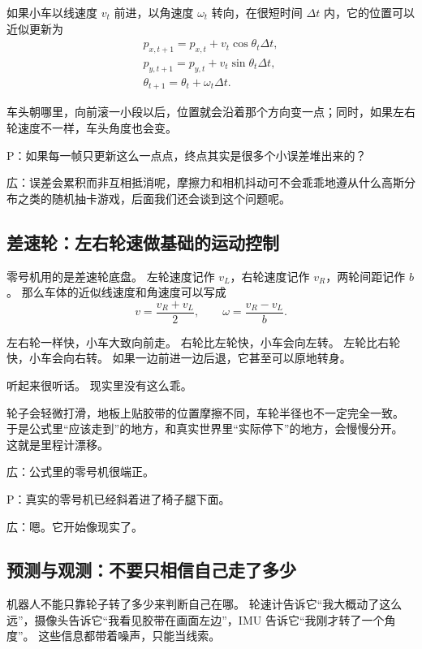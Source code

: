 如果小车以线速度 $v_t$ 前进，以角速度 $\omega_t$ 转向，在很短时间 $\Delta t$ 内，它的位置可以近似更新为
\begin{equation}
\begin{array}{l}
p_{x,t+1} = p_{x,t} + v_t \cos \theta_t \Delta t,\\
p_{y,t+1} = p_{y,t} + v_t \sin \theta_t \Delta t,\\
\theta_{t+1} = \theta_t + \omega_t \Delta t.
\end{array}
\end{equation}

车头朝哪里，向前滚一小段以后，位置就会沿着那个方向变一点；同时，如果左右轮速度不一样，车头角度也会变。

P：如果每一帧只更新这么一点点，终点其实是很多个小误差堆出来的？

広：误差会累积而非互相抵消呢，摩擦力和相机抖动可不会乖乖地遵从什么高斯分布之类的随机抽卡游戏，后面我们还会谈到这个问题呢。

\subsection{差速轮：左右轮速做基础的运动控制}

零号机用的是差速轮底盘。
左轮速度记作 $v_L$，右轮速度记作 $v_R$，两轮间距记作 $b$。
那么车体的近似线速度和角速度可以写成
\begin{equation}
v = \frac{v_R+v_L}{2}, \qquad
\omega = \frac{v_R-v_L}{b}.
\end{equation}

左右轮一样快，小车大致向前走。
右轮比左轮快，小车会向左转。
左轮比右轮快，小车会向右转。
如果一边前进一边后退，它甚至可以原地转身。

听起来很听话。
现实里没有这么乖。

轮子会轻微打滑，地板上贴胶带的位置摩擦不同，车轮半径也不一定完全一致。
于是公式里“应该走到”的地方，和真实世界里“实际停下”的地方，会慢慢分开。
这就是里程计漂移。

広：公式里的零号机很端正。

P：真实的零号机已经斜着进了椅子腿下面。

広：嗯。它开始像现实了。

\subsection{预测与观测：不要只相信自己走了多少}

机器人不能只靠轮子转了多少来判断自己在哪。
轮速计告诉它“我大概动了这么远”，摄像头告诉它“我看见胶带在画面左边”，IMU 告诉它“我刚才转了一个角度”。
这些信息都带着噪声，只能当线索。

